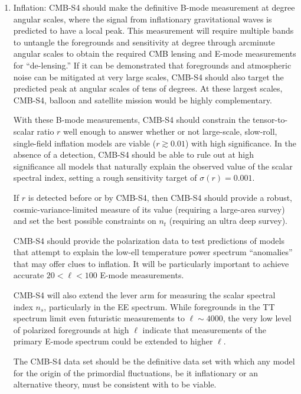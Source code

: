 \begin{enumerate}

\item{Inflation:
CMB-S4 should make the definitive B-mode measurement at degree angular scales, where the signal from inflationary gravitational waves is predicted to have a local peak. This measurement will require multiple bands to untangle the foregrounds and sensitivity at degree through arcminute angular scales to obtain the required CMB lensing and E-mode measurements for ``de-lensing.'' If it can be demonstrated that  foregrounds and atmospheric noise can be mitigated at very large scales, CMB-S4 should also target the predicted peak at angular scales of tens of degrees. At these largest scales, CMB-S4, balloon and satellite mission would be highly complementary.

With these B-mode measurements, CMB-S4 should constrain the tensor-to-scalar ratio $r$ well enough to answer whether or not large-scale, slow-roll, single-field inflation models are viable ($r \gtrsim 0.01$) with high significance. In the absence of a detection, CMB-S4 should be able to rule out at high significance all models that naturally explain the observed value of the scalar spectral index, setting a rough sensitivity target of $\sigma(r)=0.001$.

If $r$ is detected before or by CMB-S4, then CMB-S4 should provide a robust, cosmic-variance-limited measure of its value (requiring a large-area survey) and set the best possible constraints on $n_t$ (requiring an ultra deep survey). 

CMB-S4 should provide the polarization data to test predictions of models that attempt to explain the low-ell temperature power spectrum ``anomalies'' that may offer clues to inflation. It will be particularly important to achieve accurate $20 < \ell < 100$ E-mode measurements.

 CMB-S4 will also extend the lever arm for measuring the scalar spectral index $n_s$, particularly in the EE spectrum. While foregrounds in the TT spectrum limit even futuristic measurements to $\ell \sim 4000$, the very low level of polarized foregrounds at high $\ell$ indicate that measurements of the primary E-mode spectrum could be extended to higher $\ell.$

The CMB-S4 data set should be the definitive data set with which any model for the origin of the primordial fluctuations, be it inflationary or an alternative theory, must be consistent with to be viable.
}


\end{enumerate}

